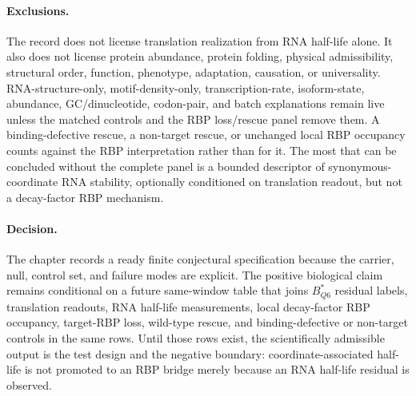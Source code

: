 \paragraph{Exclusions.}
The record does not license translation realization from RNA half-life alone.  It also does not license protein abundance, protein folding, physical admissibility, structural order, function, phenotype, adaptation, causation, or universality.  RNA-structure-only, motif-density-only, transcription-rate, isoform-state, abundance, GC/dinucleotide, codon-pair, and batch explanations remain live unless the matched controls and the RBP loss/rescue panel remove them.  A binding-defective rescue, a non-target rescue, or unchanged local RBP occupancy counts against the RBP interpretation rather than for it.  The most that can be concluded without the complete panel is a bounded descriptor of synonymous-coordinate RNA stability, optionally conditioned on translation readout, but not a decay-factor RBP mechanism.

\paragraph{Decision.}
The chapter records a ready finite conjectural specification because the carrier, null, control set, and failure modes are explicit.  The positive biological claim remains conditional on a future same-window table that joins $B^*_{Q6}$ residual labels, translation readouts, RNA half-life measurements, local decay-factor RBP occupancy, target-RBP loss, wild-type rescue, and binding-defective or non-target controls in the same rows.  Until those rows exist, the scientifically admissible output is the test design and the negative boundary: coordinate-associated half-life is not promoted to an RBP bridge merely because an RNA half-life residual is observed.
